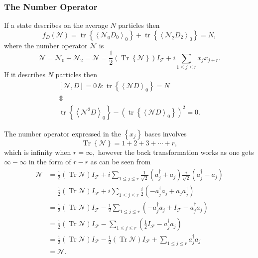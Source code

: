\documentclass[aps,preprint]{revtex4}%
\begin{document}
\subsubsection{The Number Operator}

If a state describes on the average $N$ particles then%
\begin{equation}
f_{D}\left(  \mathcal{N}\right)  =\operatorname*{tr}\left\{  \left\langle
\mathcal{N}_{0}D_{0}\right\rangle _{0}\right\}  +\operatorname*{tr}\left\{
\left\langle \mathcal{N}_{2}D_{2}\right\rangle _{0}\right\}  =N,
\end{equation}
where the number operator $\mathcal{N}$ is
\begin{equation}
\mathcal{N}=\mathcal{N}_{0}+\mathcal{N}_{2}=\mathcal{N}=\frac{1}{2}\left(
\operatorname*{Tr}\left\{  \mathcal{N}\right\}  \right)  I_{\mathcal{F}}%
+i\sum_{1\leq j\leq r}x_{j}x_{j+r}.
\end{equation}
If it describes $N$ particles then
\begin{gather}
\left[  \mathcal{N},D\right]  =0\,\&\,\operatorname*{tr}\left\{  \left\langle
\mathcal{N}D\right\rangle _{0}\right\}  =N\nonumber\\
\Updownarrow\nonumber\\
\operatorname*{tr}\left\{  \left\langle \mathcal{N}^{2}D\right\rangle
_{0}\right\}  -\left(  \operatorname*{tr}\left\{  \left\langle \mathcal{N}%
D\right\rangle _{0}\right\}  \right)  ^{2}=0.
\end{gather}


The number operator expressed in the $\left\{  x_{j}\right\}  $ bases
involves
\begin{equation}
\operatorname*{Tr}\left\{  \mathcal{N}\right\}  =1+2+3+\cdots+r,
\end{equation}
which is infinity when $r=\infty,$ however the back transformation works as
one gets $\infty-\infty$ in the form of $r-r$ as can be seen from%
\begin{align}
\mathcal{N} &  =\frac{1}{2}\left(  \operatorname*{Tr}\mathcal{N}\right)
I_{\mathcal{F}}+i\sum_{1\leq j\leq r}\frac{1}{\sqrt{2}}\left(  a_{j}^{\dagger
}+a_{j}\right)  \frac{i}{\sqrt{2}}\left(  a_{j}^{\dagger}-a_{j}\right)
\nonumber\\
&  =\frac{1}{2}\left(  \operatorname*{Tr}\mathcal{N}\right)  I_{\mathcal{F}%
}+i\sum_{1\leq j\leq r}\frac{i}{2}\left(  -a_{j}^{\dagger}a_{j}+a_{j}%
a_{j}^{\dagger}\right)  \nonumber\\
&  =\frac{1}{2}\left(  \operatorname*{Tr}\mathcal{N}\right)  I_{\mathcal{F}%
}-\frac{1}{2}\sum_{1\leq j\leq r}\left(  -a_{j}^{\dagger}a_{j}+I_{\mathcal{F}%
}-a_{j}^{\dagger}a_{j}\right)  \nonumber\\
&  =\frac{1}{2}\left(  \operatorname*{Tr}\mathcal{N}\right)  I_{\mathcal{F}%
}-\sum_{1\leq j\leq r}\left(  \frac{1}{2}I_{\mathcal{F}}-a_{j}^{\dagger}%
a_{j}\right)  \nonumber\\
&  =\frac{1}{2}\left(  \operatorname*{Tr}\mathcal{N}\right)  I_{\mathcal{F}%
}-\frac{1}{2}\left(  \operatorname*{Tr}\mathcal{N}\right)  I_{\mathcal{F}%
}+\sum_{1\leq j\leq r}a_{j}^{\dagger}a_{j}\nonumber\\
&  =\mathcal{N}.
\end{align}
\end{document}

